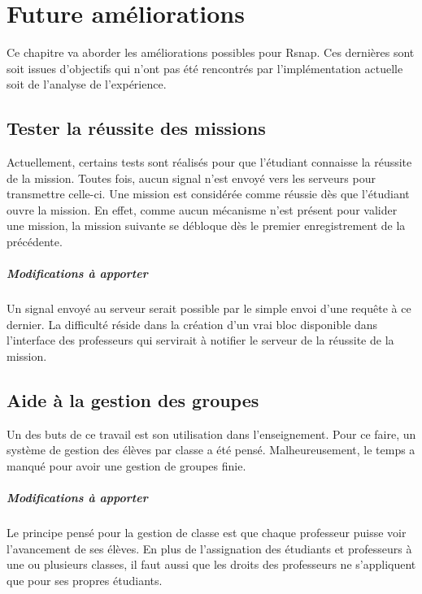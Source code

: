 ﻿\chapter{Future améliorations}
Ce chapitre va aborder les améliorations possibles pour Rsnap. Ces dernières sont soit issues d'objectifs qui n'ont pas été rencontrés par l'implémentation actuelle soit de l'analyse de l'expérience. %

\section{Tester la réussite des missions}
Actuellement, certains tests sont réalisés pour que l'étudiant connaisse la réussite de la mission. Toutes fois, aucun signal n'est envoyé vers les serveurs pour transmettre celle-ci. Une mission est considérée comme réussie dès que l'étudiant ouvre la mission. En effet, comme aucun mécanisme n'est présent pour valider une mission, la mission suivante se débloque dès le premier enregistrement de la précédente.

\paragraph{Modifications à apporter}
Un signal envoyé au serveur serait possible par le simple envoi d'une requête à ce dernier. La difficulté réside dans la création d'un vrai bloc disponible dans l'interface des professeurs qui servirait à notifier le serveur de la réussite de la mission.

\section{Aide à la gestion des groupes}
Un des buts de ce travail est son utilisation dans l'enseignement. Pour ce faire, un système de gestion des élèves par classe a été pensé. Malheureusement, le temps a manqué pour avoir une gestion de groupes finie. 

\paragraph{Modifications à apporter}
Le principe pensé pour la gestion de classe est que chaque professeur puisse voir l'avancement de ses élèves. En plus de l'assignation des étudiants et professeurs à une ou plusieurs classes, il faut aussi que les droits des professeurs ne s'appliquent que pour ses propres étudiants. 

